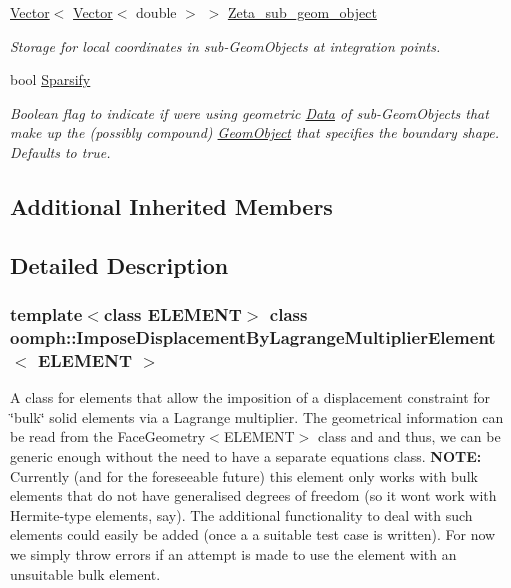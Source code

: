 \begin{DoxyCompactItemize}
\hyperlink{classoomph_1_1Vector}{Vector}$<$ \hyperlink{classoomph_1_1Vector}{Vector}$<$ double $>$ $>$ \hyperlink{classoomph_1_1ImposeDisplacementByLagrangeMultiplierElement_a05446a83806527c72790c3f001ff9cec}{Zeta\+\_\+sub\+\_\+geom\+\_\+object}
\begin{DoxyCompactList}\small\item\em Storage for local coordinates in sub-\/\+Geom\+Objects at integration points. \end{DoxyCompactList}\item 
bool \hyperlink{classoomph_1_1ImposeDisplacementByLagrangeMultiplierElement_ab8a7884a570a2ac0f3ea1f38642f26a7}{Sparsify}
\begin{DoxyCompactList}\small\item\em Boolean flag to indicate if we\textquotesingle{}re using geometric \hyperlink{classoomph_1_1Data}{Data} of sub-\/\+Geom\+Objects that make up the (possibly compound) \hyperlink{classoomph_1_1GeomObject}{Geom\+Object} that specifies the boundary shape. Defaults to true. \end{DoxyCompactList}\end{DoxyCompactItemize}
\subsection*{Additional Inherited Members}


\subsection{Detailed Description}
\subsubsection*{template$<$class E\+L\+E\+M\+E\+NT$>$\newline
class oomph\+::\+Impose\+Displacement\+By\+Lagrange\+Multiplier\+Element$<$ E\+L\+E\+M\+E\+N\+T $>$}

A class for elements that allow the imposition of a displacement constraint for \char`\"{}bulk\char`\"{} solid elements via a Lagrange multiplier. The geometrical information can be read from the Face\+Geometry$<$\+E\+L\+E\+M\+E\+N\+T$>$ class and and thus, we can be generic enough without the need to have a separate equations class. {\bfseries N\+O\+TE\+:} Currently (and for the foreseeable future) this element only works with bulk elements that do not have generalised degrees of freedom (so it won\textquotesingle{}t work with Hermite-\/type elements, say). The additional functionality to deal with such elements could easily be added (once a a suitable test case is written). For now we simply throw errors if an attempt is made to use the element with an unsuitable bulk element. 

